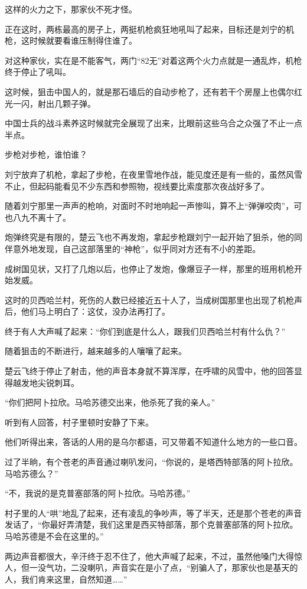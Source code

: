这样的火力之下，那家伙不死才怪。

正在这时，两栋最高的房子上，两挺机枪疯狂地吼叫了起来，目标还是刘宁的机枪，这时候就要看谁压制得住谁了。

对这种家伙，实在是不能客气，两门“82无”对着这两个火力点就是一通乱炸，机枪终于停止了吼叫。

这时候，狙击中国人的，就是那石墙后的自动步枪了，还有若干个房屋上也偶尔红光一闪，射出几颗子弹。

中国士兵的战斗素养这时候就完全展现了出来，比眼前这些乌合之众强了不止一点半点。

步枪对步枪，谁怕谁？

刘宁放弃了机枪，拿起了步枪，在夜里雪地作战，能见度还是有一些的，虽然风雪不止，但起码能看见不少东西和参照物，视线要比索度那次夜战好多了。

随着刘宁那里一声声的枪响，对面时不时地响起一声惨叫，算不上“弹弹咬肉”，可也八九不离十了。

炮弹终究是有限的，楚云飞也不再发炮，拿起步枪跟刘宁一起开始了狙杀，他的同伴意外地发现，自己这部落里的“神枪”，似乎同对方还有不小的差距。

成树国见状，又打了几炮以后，也停止了发炮，像爆豆子一样，那里的班用机枪开始发威。

这时的贝西哈兰村，死伤的人数已经接近五十人了，当成树国那里也出现了机枪声后，他们马上明白了：这仗，没办法再打了。

终于有人大声喊了起来：“你们到底是什么人，跟我们贝西哈兰村有什么仇？”

随着狙击的不断进行，越来越多的人嚷嚷了起来。

楚云飞终于停止了射击，他的声音本身就不算浑厚，在呼啸的风雪中，他的回答显得越发地尖锐刺耳。

“你们把阿卜拉欣。马哈苏德交出来，他杀死了我的亲人。”

听到有人回答，村子里顿时安静了下来。

他们听得出来，答话的人用的是乌尔都语，可又带着不知道什么地方的一些口音。

过了半晌，有个苍老的声音通过喇叭发问，“你说的，是塔西特部落的阿卜拉欣。马哈苏德么？”

“不，我说的是克普塞部落的阿卜拉欣。马哈苏德。”

村子里的人“哄”地乱了起来，还有凌乱的争吵声，等了半天，还是那个苍老的声音发话了，“你最好弄清楚，我们这里是西买特部落，那个克普塞部落的阿卜拉欣。马哈苏德是不会在这里的。”

两边声音都很大，辛汗终于忍不住了，他大声喊了起来，不过，虽然他嗓门大得惊人，但一没气功，二没喇叭，声音实在是小了点，“别骗人了，那家伙也是基天的人，我们肯来这里，自然知道……”

